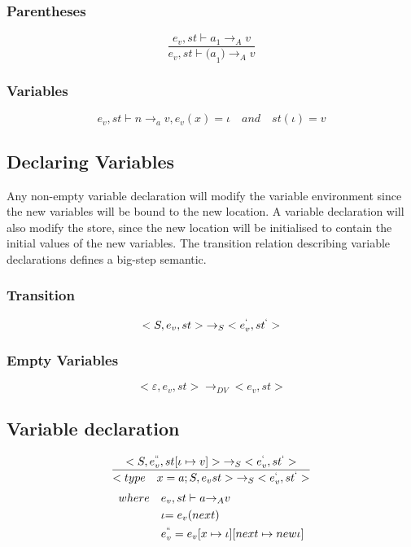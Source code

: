 \subsubsection{Parentheses}
\begin{equation}
	\frac { { e }_{ v },st\vdash { a }_{ 1 }{ \rightarrow  }_{ A }{ v } }{ { e }_{ v },st\vdash { (a }_{ 1 }){ \rightarrow  }_{ A }{ v } }
\end{equation}


\subsubsection{Variables}
\begin{equation}
	{ e }_{ v },st\vdash n{ \rightarrow  }_{ a }v, { e }_{ v }(x)=\iota\quad and\quad st(\iota )=v
\end{equation}


\subsection*{Declaring Variables}
Any non-empty variable declaration will modify the variable environment since the new variables will be bound to the new location.
A variable declaration will also modify the store, since the new location will be initialised to contain the initial values of the new variables.
The transition relation describing variable declarations defines a big-step semantic.

\subsubsection{Transition}
\begin{equation}
<{ S },{ e }_{ v },st>{ \rightarrow  }_{ S }<{ e }_{ v }^{ ` },{ st }^{ ` }>
\end{equation}

\subsubsection{Empty Variables}
\begin{equation}
	<\varepsilon,{ e }_{ v },st>{ \rightarrow  }_{ DV }<{ e }_{ v },st>
\end{equation}

\subsection*{Variable declaration}
\begin{equation}
	\frac { <S,{ e }_{ v }^{ `` },st[\iota \mapsto v]>{ \rightarrow  }_{ S }<{ e }_{ v }^{ ` },{ st }^{ ` }> }{ <type\quad x=a;S,{ e }_{ v }st>{ \rightarrow  }_{ S }<{ e }_{ v }^{ ` },{ st }^{ ` }> } 
\end{equation}
\begin{align*}
	where\quad &{ e }_{ v },st\vdash a{ \rightarrow  }_{ A }v \\
	&\iota {= e }_{ v }(next) \\
	&{ e }_{ v }^{ `` }={ e }_{ v }[x\mapsto \iota ][next\mapsto new \iota ]
\end{align*}

